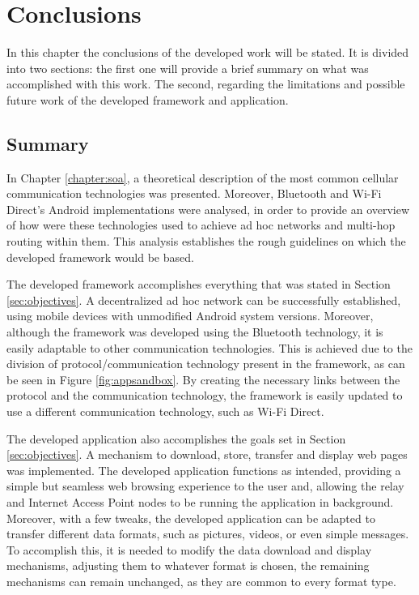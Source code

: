
\chapter{Conclusions}
\label{chapter:conclusion}

In this chapter the conclusions of the developed work will be stated. It is divided into two sections: the first one will provide a brief summary on what was accomplished with this work. The second, regarding the limitations and possible future work of the developed framework and application.

\section{Summary}

In Chapter \ref{chapter:soa}, a theoretical description of the most common cellular communication technologies was presented. Moreover, Bluetooth and Wi-Fi Direct's Android implementations were analysed, in order to provide an overview of how were these technologies used to achieve ad hoc networks and multi-hop routing within them. This analysis establishes the rough guidelines on which the developed framework would be based.

The developed framework accomplishes everything that was stated in Section \ref{sec:objectives}. A decentralized ad hoc network can be successfully established, using mobile devices with unmodified Android system versions. Moreover, although the framework was developed using the Bluetooth technology, it is easily adaptable to other communication technologies. This is achieved due to the division of protocol/communication technology present in the framework, as can be seen in Figure \ref{fig:appsandbox}. By creating the necessary links between the protocol and the communication technology, the framework is easily updated to use a different communication technology, such as Wi-Fi Direct.

The developed application also accomplishes the goals set in Section \ref{sec:objectives}. A mechanism to download, store, transfer and display web pages was implemented. The developed application functions as intended, providing a simple but seamless web browsing experience to the user and, allowing the relay and Internet Access Point nodes to be running the application in background.  Moreover, with a few tweaks, the developed application can be adapted to transfer different data formats, such as pictures, videos, or even simple messages. To accomplish this, it is needed to modify the data download and display mechanisms, adjusting them to whatever format is chosen, the remaining mechanisms can remain unchanged, as they are common to every format type.


